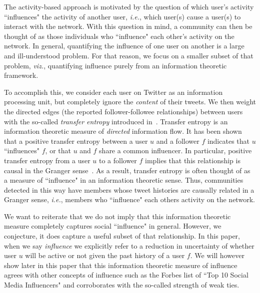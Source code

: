 The activity-based approach is motivated by the question of which user's activity ``influences" the activity of another user, \emph{i.e.}, which user(s) cause a user(s) to interact with the network. With this question in mind, a community can then be thought of as those individuals who ``influence" each other's activity on the network. In general, quantifying the influence of one user on another is a large and ill-understood problem. For that reason, we focus on a smaller subset of that problem, \emph{viz.}, quantifying influence purely from an information theoretic framework.

To accomplish this, we consider each user on Twitter as an information processing unit, but completely ignore the \emph{content} of their tweets. We then weight the directed edges (the reported follower-followee relationships) between users with the so-called \emph{transfer entropy} introduced in~\cite{schreiber2000measuring}.  Transfer entropy is an information theoretic measure of \emph{directed} information flow. It has been shown~\cite{ver2012information} that a positive transfer entropy between a user $u$ and a follower $f$ indicates that $u$ ``influences" $f$, or that $u$ and $f$ share a common influencer. In particular, positive transfer entropy from a user $u$ to a follower $f$ implies that this relationship is causal in the Granger sense~\cite{granger1963economic}. As a result, transfer entropy is often thought of as a measure of ``influence" in an information theoretic sense.  Thus, communities detected in this way have members whose tweet histories are causally related in a Granger sense, \emph{i.e.}, members who ``influence" each others activity on the network.

We want to reiterate that we do not imply that this information theoretic measure completely captures social ``influence" in general. However, we conjecture, it does capture a useful subset of that relationship. In this paper, when we say \emph{influence} we explicitly refer to a reduction in uncertainty of whether user $u$ will be active or not given the past history of a user $f$. We will however show later in this paper that this information theoretic measure of influence agrees with other concepts of influence such as the Forbes list of ``Top 10 Social Media Influencers" and corroborates with the so-called strength of weak ties\cite{granovetter1973strength}.


